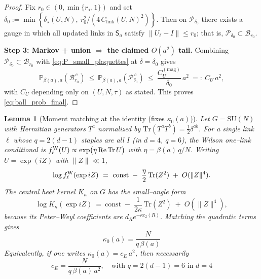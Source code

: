 \documentclass[11pt]{amsart}
\theoremstyle{plain}
\newtheorem{lemma}[theorem]{Lemma}
\theoremstyle{definition}
\theoremstyle{remark}
\renewcommand{\tfrac}[2]{\textstyle\frac{#1}{#2}}
\begin{document}
\begin{proof}
Fix $r_0\in(0,\min\{r_\star,1\})$ and set $\delta_0:=\min\!\left\{\delta_\star(U,N),\ r_0^2/(4\,C_{\mathrm{link}}(U,N)^2)\right\}$. Then on $\mathcal P_{\delta_0}$ there exists a gauge in which all updated links in $\mathsf S_a$ satisfy $\|U_\ell-I\|\le r_0$; that is, $\mathcal P_{\delta_0}\subset\mathcal B_{r_0}$.

\medskip
\textbf{Step 3: Markov + union $\Rightarrow$ the claimed $O(a^2)$ tail.}
Combining $\mathcal P_{\delta_0}\subset\mathcal B_{r_0}$ with \eqref{eq:P_small_plaquettes} at $\delta=\delta_0$ gives
\[
\mathbb P_{\beta(a),a}\!\left(\mathcal B_{r_0}^{\,c}\right)
\ \le\ \mathbb P_{\beta(a),a}\!\left(\mathcal P_{\delta_0}^{\,c}\right)
\ \le\ \frac{C_U^{(\mathrm{mag})}}{\delta_0}\,a^2
\ =:\ C_U\,a^2,
\]
with $C_U$ depending only on $(U,N,\tau)$ as stated. This proves \eqref{eq:ball_prob_final}.
\end{proof}

\begin{lemma}[Moment matching at the identity (fixes $\kappa_0(a)$)]\label{lem:moment-matching-kappa0}
Let $G=\mathrm{SU}(N)$ with Hermitian generators $T^a$ normalized by $\mathrm{Tr}(T^a T^b)=\tfrac12\delta^{ab}$. For a single link $\ell$ whose $q=2(d-1)$ staples are all $I$ (in $d=4$, $q=6$), the Wilson one--link conditional is $f^{\rm W}_\ell(U)\propto \exp\!\big(\eta\,\mathrm{Re\,Tr}\,U\big)$ with $\eta=\beta(a)\,q/N$. Writing $U=\exp(iZ)$ with $\|Z\|\ll1$,
\[
  \log f^{\rm W}_\ell(\exp iZ) \ =\ \mathrm{const}\;-\;\frac{\eta}{2}\,\mathrm{Tr}(Z^2)\;+\;O(\|Z\|^4).
\]
The central heat kernel $K_\kappa$ on $G$ has the small--angle form
\[
  \log K_\kappa(\exp iZ) \ =\ \mathrm{const}\;-\;\frac{1}{2\kappa}\,\mathrm{Tr}(Z^2)\;+\;O(\|Z\|^4),
\]
because its Peter--Weyl coefficients are $d_R e^{-\kappa c_2(R)}$. Matching the quadratic terms gives
\begin{equation}
  \boxed{\kappa_0(a) = \frac{N}{q\,\beta(a)}}
\end{equation}
Equivalently, if one writes $\kappa_0(a)=c_E\,a^2$, then necessarily
\begin{equation}
  \boxed{c_E = \frac{N}{q\,\beta(a)\,a^2}, \quad\text{with } q=2(d-1)=6 \text{ in } d=4}
\end{equation}
\end{lemma}
\end{document}

